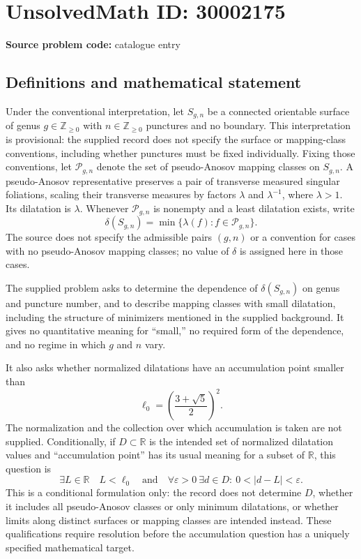 \documentclass[11pt]{article}
\newcommand{\Z}{\mathbb{Z}}
\newcommand{\R}{\mathbb{R}}
\begin{document}
\section*{UnsolvedMath ID: 30002175}
\textbf{Source problem code:} catalogue entry
\subsection{Definitions and mathematical statement}
Under the conventional interpretation, let \(S_{g,n}\) be a connected orientable surface of genus \(g\in\Z_{\geq0}\) with \(n\in\Z_{\geq0}\) punctures and no boundary. This interpretation is provisional: the supplied record does not specify the surface or mapping-class conventions, including whether punctures must be fixed individually. Fixing those conventions, let \(\mathcal P_{g,n}\) denote the set of pseudo-Anosov mapping classes on \(S_{g,n}\). A pseudo-Anosov representative preserves a pair of transverse measured singular foliations, scaling their transverse measures by factors \(\lambda\) and \(\lambda^{-1}\), where \(\lambda>1\). Its dilatation is \(\lambda\). Whenever \(\mathcal P_{g,n}\) is nonempty and a least dilatation exists, write
\[
\delta(S_{g,n})=\min\{\lambda(f):f\in\mathcal P_{g,n}\}.
\]
The source does not specify the admissible pairs \((g,n)\) or a convention for cases with no pseudo-Anosov mapping classes; no value of \(\delta\) is assigned here in those cases.

The supplied problem asks to determine the dependence of \(\delta(S_{g,n})\) on genus and puncture number, and to describe mapping classes with small dilatation, including the structure of minimizers mentioned in the supplied background. It gives no quantitative meaning for ``small,'' no required form of the dependence, and no regime in which \(g\) and \(n\) vary.

It also asks whether normalized dilatations have an accumulation point smaller than
\[
\ell_0=\left(\frac{3+\sqrt5}{2}\right)^2.
\]
The normalization and the collection over which accumulation is taken are not supplied. Conditionally, if \(D\subset\R\) is the intended set of normalized dilatation values and ``accumulation point'' has its usual meaning for a subset of \(\R\), this question is
\[
\exists L\in\R\quad L<\ell_0\quad\text{and}\quad
\forall\varepsilon>0\ \exists d\in D:\ 0<|d-L|<\varepsilon.
\]
This is a conditional formulation only: the record does not determine \(D\), whether it includes all pseudo-Anosov classes or only minimum dilatations, or whether limits along distinct surfaces or mapping classes are intended instead. These qualifications require resolution before the accumulation question has a uniquely specified mathematical target.
\end{document}
